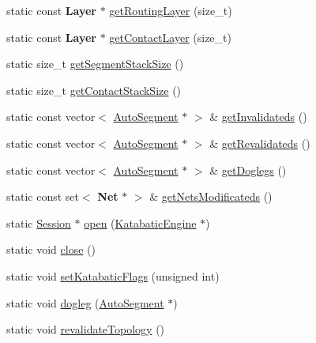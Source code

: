 \begin{DoxyCompactItemize}
\item 
static const \textbf{ Layer} $\ast$ \mbox{\hyperlink{classKatabatic_1_1Session_a3efd0f0d87be640dc566c1afd821e5e6}{get\+Routing\+Layer}} (size\+\_\+t)
\item 
static const \textbf{ Layer} $\ast$ \mbox{\hyperlink{classKatabatic_1_1Session_ad3ee60a34f480bd3aecd8c7d957ff52e}{get\+Contact\+Layer}} (size\+\_\+t)
\item 
static size\+\_\+t \mbox{\hyperlink{classKatabatic_1_1Session_ac9c144a8faf97714069824933970923c}{get\+Segment\+Stack\+Size}} ()
\item 
static size\+\_\+t \mbox{\hyperlink{classKatabatic_1_1Session_a0d0c0159030a32b78ab4ad2b58871bce}{get\+Contact\+Stack\+Size}} ()
\item 
static const vector$<$ \mbox{\hyperlink{classKatabatic_1_1AutoSegment}{Auto\+Segment}} $\ast$ $>$ \& \mbox{\hyperlink{classKatabatic_1_1Session_a6060b7e972f3c0d10cfa158b5ed174e6}{get\+Invalidateds}} ()
\item 
static const vector$<$ \mbox{\hyperlink{classKatabatic_1_1AutoSegment}{Auto\+Segment}} $\ast$ $>$ \& \mbox{\hyperlink{classKatabatic_1_1Session_af5675d50557db83d11b7d2151de5f34c}{get\+Revalidateds}} ()
\item 
static const vector$<$ \mbox{\hyperlink{classKatabatic_1_1AutoSegment}{Auto\+Segment}} $\ast$ $>$ \& \mbox{\hyperlink{classKatabatic_1_1Session_a84211b77fe7fb8b49a93d7f298a5de90}{get\+Doglegs}} ()
\item 
static const set$<$ \textbf{ Net} $\ast$ $>$ \& \mbox{\hyperlink{classKatabatic_1_1Session_a6c3be93d98029b06138f633342d04157}{get\+Nets\+Modificateds}} ()
\item 
static \mbox{\hyperlink{classKatabatic_1_1Session}{Session}} $\ast$ \mbox{\hyperlink{classKatabatic_1_1Session_a000e098850f6cccff6b289a294149a41}{open}} (\mbox{\hyperlink{classKatabatic_1_1KatabaticEngine}{Katabatic\+Engine}} $\ast$)
\item 
static void \mbox{\hyperlink{classKatabatic_1_1Session_a5ae591df94fc66ccb85cbb6565368bca}{close}} ()
\item 
static void \mbox{\hyperlink{classKatabatic_1_1Session_af9919aefa1db2478b3d1813c1872d175}{set\+Katabatic\+Flags}} (unsigned int)
\item 
static void \mbox{\hyperlink{classKatabatic_1_1Session_aed01e83f7d8dc7acd85156256a9e776c}{dogleg}} (\mbox{\hyperlink{classKatabatic_1_1AutoSegment}{Auto\+Segment}} $\ast$)
\item 
static void \mbox{\hyperlink{classKatabatic_1_1Session_a69fc41ca90fae86766ae9d528394868f}{revalidate\+Topology}} ()

\end{DoxyCompactItemize}
